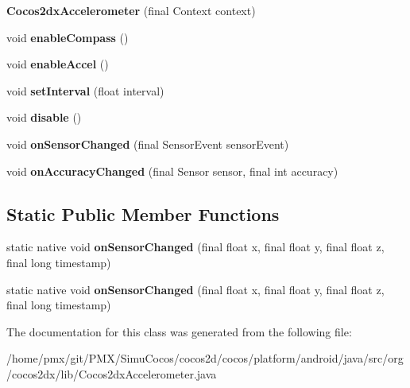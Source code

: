 \begin{DoxyCompactItemize}
{\bfseries Cocos2dx\+Accelerometer} (final Context context)
\item 
\mbox{\label{classorg_1_1cocos2dx_1_1lib_1_1Cocos2dxAccelerometer_a15d9d5839b1732b00a370d2e6ea8df85}} 
void {\bfseries enable\+Compass} ()
\item 
\mbox{\label{classorg_1_1cocos2dx_1_1lib_1_1Cocos2dxAccelerometer_aeb8845518cbb246238d4dda5e39a6e54}} 
void {\bfseries enable\+Accel} ()
\item 
\mbox{\label{classorg_1_1cocos2dx_1_1lib_1_1Cocos2dxAccelerometer_ae68e3f14ee6bae620c7068520c5c9453}} 
void {\bfseries set\+Interval} (float interval)
\item 
\mbox{\label{classorg_1_1cocos2dx_1_1lib_1_1Cocos2dxAccelerometer_a07d871f22a98e6081351269b53bdc93b}} 
void {\bfseries disable} ()
\item 
\mbox{\label{classorg_1_1cocos2dx_1_1lib_1_1Cocos2dxAccelerometer_a2609e24f0feaf7087a8aca9745082132}} 
void {\bfseries on\+Sensor\+Changed} (final Sensor\+Event sensor\+Event)
\item 
\mbox{\label{classorg_1_1cocos2dx_1_1lib_1_1Cocos2dxAccelerometer_afd435fe99c31dc1e7e0bb75ec7ccf5d0}} 
void {\bfseries on\+Accuracy\+Changed} (final Sensor sensor, final int accuracy)
\end{DoxyCompactItemize}
\subsection*{Static Public Member Functions}
\begin{DoxyCompactItemize}
\item 
\mbox{\label{classorg_1_1cocos2dx_1_1lib_1_1Cocos2dxAccelerometer_a88d28f7da3db43f5a7406eddd4dfe321}} 
static native void {\bfseries on\+Sensor\+Changed} (final float x, final float y, final float z, final long timestamp)
\item 
\mbox{\label{classorg_1_1cocos2dx_1_1lib_1_1Cocos2dxAccelerometer_a88d28f7da3db43f5a7406eddd4dfe321}} 
static native void {\bfseries on\+Sensor\+Changed} (final float x, final float y, final float z, final long timestamp)
\end{DoxyCompactItemize}


The documentation for this class was generated from the following file\+:\begin{DoxyCompactItemize}
\item 
/home/pmx/git/\+P\+M\+X/\+Simu\+Cocos/cocos2d/cocos/platform/android/java/src/org/cocos2dx/lib/Cocos2dx\+Accelerometer.\+java\end{DoxyCompactItemize}
